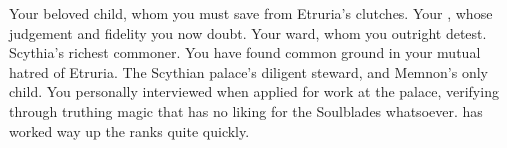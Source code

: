 \documentclass[char]{Kos}
\begin{document}
\begin{contacts}
\contact{\cBride{}} Your beloved child, whom you must save from Etruria's clutches.
\contact{\cScythiaKing{}} Your \cScythiaKing{\spouse}, whose judgement and fidelity you now doubt.
\contact{\cWard{}} Your ward, whom you outright detest.
\contact{\cArmsDealer{}} Scythia's richest commoner. You have found common ground in your mutual hatred of Etruria.
\contact{\cButler{}} The Scythian palace's diligent steward, and Memnon's only child. You personally interviewed \cButler{\them} when \cButler{\they} applied for work at the palace, verifying through truthing magic that \cButler{\they} has no liking for the Soulblades whatsoever. \cButler{\They} has worked \cButler{\their} way up the ranks quite quickly.
\end{contacts} 
\end{document}
